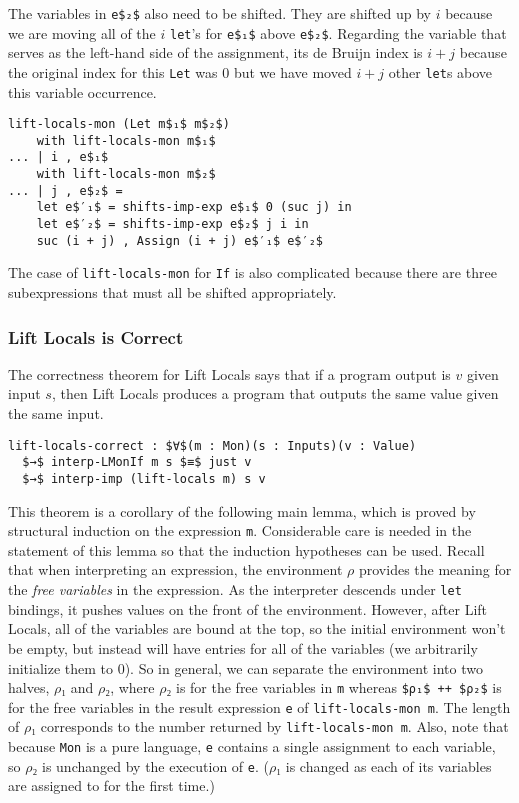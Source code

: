 \documentclass[sigplan,review,dvipsnames,screen,10pt]{acmart}
\begin{document}
The variables in \lstinline{e$₂$} also need to be shifted.  They are
shifted up by $i$ because we are moving all of the $i$
\lstinline{let}'s for \lstinline{e$₁$} above
\lstinline{e$₂$}. Regarding the variable that serves as the left-hand
side of the assignment, its de Bruijn index is $i + j$ because the
original index for this \lstinline{Let} was $0$ but we have moved $i +
j$ other \lstinline{let}s above this variable occurrence.

\begin{lstlisting}
lift-locals-mon (Let m$₁$ m$₂$)
    with lift-locals-mon m$₁$
... | i , e$₁$
    with lift-locals-mon m$₂$
... | j , e$₂$ =
    let e$′₁$ = shifts-imp-exp e$₁$ 0 (suc j) in
    let e$′₂$ = shifts-imp-exp e$₂$ j i in
    suc (i + j) , Assign (i + j) e$′₁$ e$′₂$
\end{lstlisting}

The case of \lstinline{lift-locals-mon} for \lstinline{If} is also
complicated because there are three subexpressions that must all be
shifted appropriately.

\subsubsection{Lift Locals is Correct}

The correctness theorem for Lift Locals says that if a program output
is $v$ given input $s$, then Lift Locals produces a program that
outputs the same value given the same input.

\begin{lstlisting}
lift-locals-correct : $∀$(m : Mon)(s : Inputs)(v : Value)
  $→$ interp-LMonIf m s $≡$ just v
  $→$ interp-imp (lift-locals m) s v
\end{lstlisting}

This theorem is a corollary of the following main lemma, which is
proved by structural induction on the expression \lstinline{m}.
Considerable care is needed in the statement of this lemma so that the
induction hypotheses can be used. Recall that when interpreting an
expression, the environment $ρ$ provides the meaning for the
\emph{free variables} in the expression.  As the interpreter descends
under \lstinline{let} bindings, it pushes values on the front of the
environment. However, after Lift Locals, all of the variables are
bound at the top, so the initial environment won't be empty, but
instead will have entries for all of the variables (we arbitrarily
initialize them to $0$). So in general, we can separate the
environment into two halves, $ρ₁$ and $ρ₂$, where $ρ₂$ is for the free
variables in \lstinline{m} whereas \lstinline{$ρ₁$ ++ $ρ₂$} is for the
free variables in the result expression \lstinline{e} of
\lstinline{lift-locals-mon m}. The length of $ρ₁$ corresponds to the
number returned by \lstinline{lift-locals-mon m}. Also, note that
because \lstinline{Mon} is a pure language, \lstinline{e} contains a
single assignment to each variable, so $ρ₂$ is unchanged by the
execution of \lstinline{e}. ($ρ₁$ is changed as each of its variables
are assigned to for the first time.)
\end{document}

